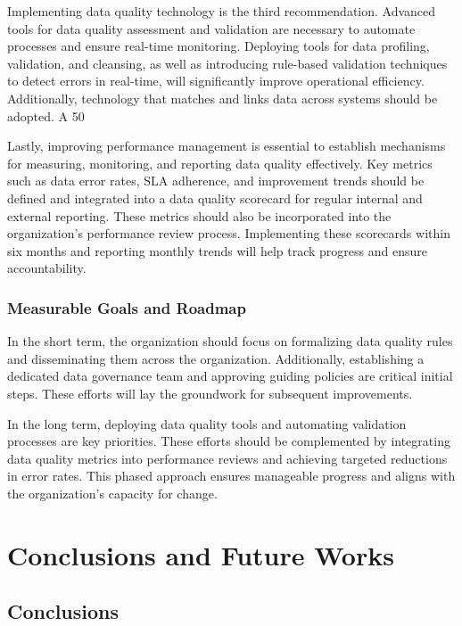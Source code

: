 \documentclass[conference]{IEEEtran}
\begin{document}
Implementing data quality technology is the third recommendation. Advanced tools for data quality assessment and validation are necessary to automate processes and ensure real-time monitoring. Deploying tools for data profiling, validation, and cleansing, as well as introducing rule-based validation techniques to detect errors in real-time, will significantly improve operational efficiency. Additionally, technology that matches and links data across systems should be adopted. A 50%

Lastly, improving performance management is essential to establish mechanisms for measuring, monitoring, and reporting data quality effectively. Key metrics such as data error rates, SLA adherence, and improvement trends should be defined and integrated into a data quality scorecard for regular internal and external reporting. These metrics should also be incorporated into the organization’s performance review process. Implementing these scorecards within six months and reporting monthly trends will help track progress and ensure accountability.

\subsubsection{Measurable Goals and Roadmap}

In the short term, the organization should focus on formalizing data quality rules and disseminating them across the organization. Additionally, establishing a dedicated data governance team and approving guiding policies are critical initial steps. These efforts will lay the groundwork for subsequent improvements.

In the long term, deploying data quality tools and automating validation processes are key priorities. These efforts should be complemented by integrating data quality metrics into performance reviews and achieving targeted reductions in error rates. This phased approach ensures manageable progress and aligns with the organization’s capacity for change.



\section{Conclusions and Future Works}

\subsection{Conclusions}
\end{document}
